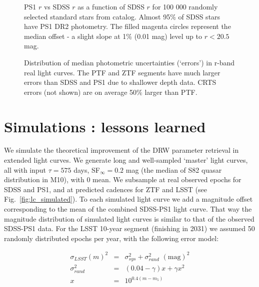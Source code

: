 \documentclass[twocolumn]{aastex62}
\begin{document}
\begin{figure}%
	\caption{PS1 $r$ vs SDSS $r$ as a function of SDSS $r$ for 100 000 randomly selected standard stars from \citet{ivezic2007} catalog. Almost 95\% of SDSS stars have PS1 DR2 photometry. The filled magenta circles represent the median offset - a slight slope at 1\% (0.01 mag) level up to $r<20.5$ mag.}
	\label{fig:offsetPS1mag}
\end{figure} 



\begin{figure}%
	\caption{Distribution of median photometric uncertainties (`errors') in r-band real light curves. The PTF and ZTF segments have much larger errors than SDSS and PS1 due to shallower depth data. CRTS errors (not shown) are on average 50\% larger than PTF.}
	\label{fig:lc_errors}
\end{figure} 

%
%
%
%
%

\section{Simulations : lessons learned}\label{sec:simulation}

We simulate the theoretical improvement of the DRW parameter retrieval in extended light curves. We generate long and well-sampled  `master' light curves, all with input $\tau = 575 $ days, SF$_{\infty} = 0.2$ mag (the median of S82 quasar distribution in M10), with 0 mean.  We subsample at real observed epochs for SDSS and PS1, and at predicted cadences for ZTF and LSST  (see Fig.~\ref{fig:lc_simulated}). To each simulated light curve we add a magnitude offset corresponding to the mean of the combined SDSS-PS1 light curve. That way the magnitude distribution of simulated light curves is similar to that of the observed SDSS-PS1 data. For the LSST 10-year segment (finishing in 2031) we assumed 50 randomly distributed  epochs per year, with the following error model:

\begin{eqnarray}
\label{eq:errorModel}
\sigma_{LSST}(m)^{2} &=& \sigma_{sys}^{2} + \sigma_{rand}^{2} \,\, \mathrm{(mag)}^{2} \\
\sigma_{rand}^{2} &=& (0.04-\gamma)x + \gamma x^{2} \nonumber \\
x &=& 10^{0.4(m-m_{5})} \nonumber
\end{eqnarray}
\end{document}
